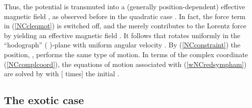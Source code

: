 \documentclass[a4paper,11pt]{article}
\providecommand{\vx}{{\vec x}}
\def\vp{{\vec p}}
\def\vx{{\vec x}}
\begin{document}
Thus, the potential is transmuted into a (generally position-dependent)
effective magnetic field \coordHE{}, as
observed before in the quadratic case \cite{NaPo}.
In fact, the force term in (\ref{NCcleqmot}) is switched off,
and the \coordHE{} merely contributes to the Lorentz force by
yielding an effective magnetic field \coordHE{}.
It follows that \myHighlight{$\vp$}\coordHE{} rotates uniformly in the
``hodograph'' ( \myHighlight{$\equiv \vp$}\coordHE{} )-plane with uniform angular velocity
\coordHE{}.
By (\ref{NCconstraint}) the position, \myHighlight{$\vx$}\coordHE{}, performs the same type of
motion. In terms of the complex coordinate
(\ref{NCcomplcoord}),
the equations of motion associated with (\ref{wNCredsympham})
are solved by
\coordHE{}
with [\coordHE{} times] \myHighlight{$\zeta$}\coordHE{} the initial \myHighlight{$\vp$}\coordHE{}.


\goodbreak
\subsection{The exotic case}
\end{document}
